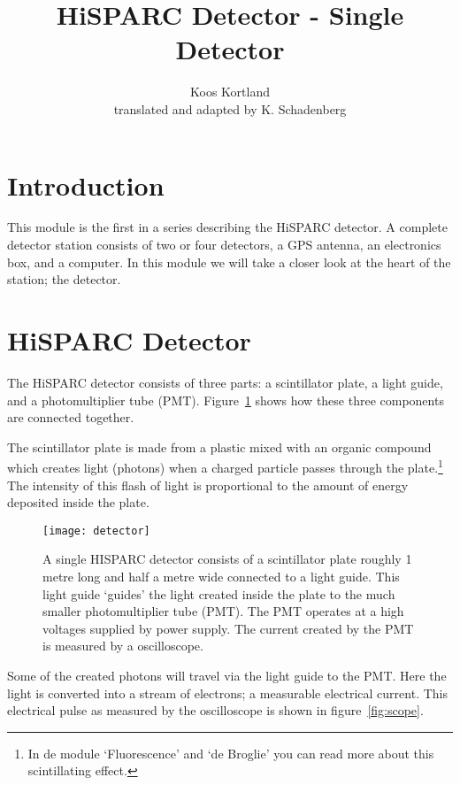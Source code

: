 


\author{Koos Kortland \\ translated and adapted by K. Schadenberg}
\date{}
\title{HiSPARC Detector - Single Detector}



\maketitle

\section{Introduction}
This module is the first in a series describing the HiSPARC detector. A complete detector station consists of two or four detectors, a GPS antenna, an electronics box, and a computer. In this module we will take a closer look at the heart of the station; the detector. 

\section{HiSPARC Detector}
The HiSPARC detector consists of three parts: a scintillator plate, a light guide, and a photomultiplier tube (PMT). Figure~\ref{fig:detector} shows how these three components are connected together.

The scintillator plate is made from a plastic mixed with an organic compound which creates light (photons) when a charged particle passes through the plate.\footnote{In de module `Fluorescence' and `de Broglie' you can read more about this scintillating effect.} The intensity of this flash of light is proportional to the amount of energy deposited inside the plate.

\begin{figure}\begin{center}
\texttt{[image: detector]}%
\caption{A single HISPARC detector consists of a scintillator plate roughly 1 metre long and half a metre wide connected to a light guide. This light guide `guides' the light created inside the plate to the much smaller photomultiplier tube (PMT). The PMT operates at a high voltages supplied by power supply. The current created by the PMT is measured by a oscilloscope.}\label{fig:detector}
\end{center}\end{figure}

Some of the created photons will travel via the light guide to the PMT. Here the light is converted into a stream of electrons; a measurable electrical current. This electrical pulse as measured by the oscilloscope is shown in figure~\ref{fig:scope}.

